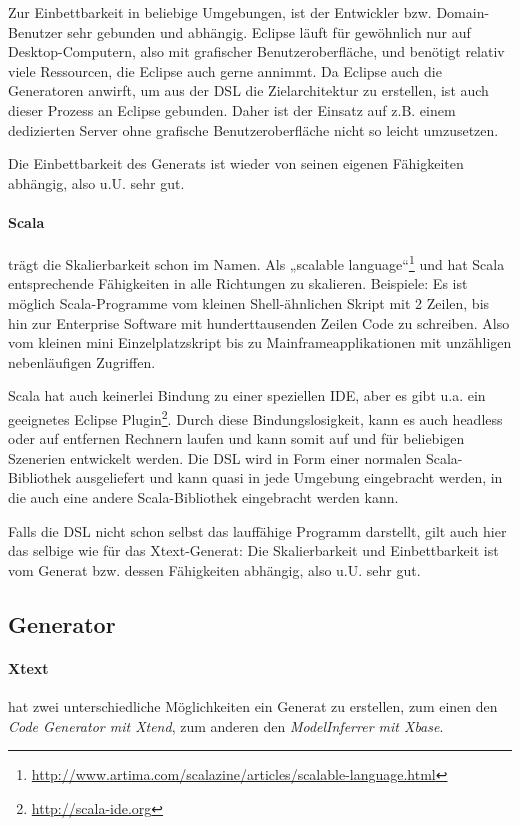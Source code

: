 Zur Einbettbarkeit in beliebige Umgebungen, ist der Entwickler bzw.
Domain-Benutzer sehr gebunden und abhängig. Eclipse läuft für gewöhnlich
nur auf Desktop-Computern, also mit grafischer Benutzeroberfläche,
und benötigt relativ viele Ressourcen, die Eclipse auch
gerne annimmt.
Da Eclipse auch die Generatoren anwirft, um aus der DSL
die Zielarchitektur zu erstellen, ist auch dieser Prozess an Eclipse gebunden.
Daher ist der Einsatz auf z.B. einem dedizierten Server ohne grafische
Benutzeroberfläche nicht so leicht umzusetzen.

Die Einbettbarkeit des Generats ist wieder von seinen eigenen Fähigkeiten
abhängig, also u.U. sehr gut.

\paragraph{Scala} trägt die Skalierbarkeit schon im Namen. 
Als „scalable language“\footnote{
\url{http://www.artima.com/scalazine/articles/scalable-language.html}}
und hat Scala entsprechende Fähigkeiten in alle Richtungen
zu skalieren. Beispiele: Es ist möglich Scala-Programme vom kleinen
Shell-ähnlichen Skript mit 2 Zeilen, bis hin zur Enterprise Software
mit hunderttausenden Zeilen Code zu schreiben. Also vom kleinen mini
Einzelplatzskript bis zu Mainframeapplikationen mit unzähligen nebenläufigen
Zugriffen.

Scala hat auch keinerlei Bindung zu einer speziellen IDE, aber es gibt
u.a. ein geeignetes Eclipse Plugin\footnote{ \url{http://scala-ide.org}}.
Durch diese Bindungslosigkeit, kann
es auch headless oder auf entfernen Rechnern laufen und kann somit auf und für
beliebigen Szenerien entwickelt werden.
Die DSL wird in Form einer normalen Scala-Bibliothek ausgeliefert und
kann quasi in jede Umgebung eingebracht werden, in die auch eine andere
Scala-Bibliothek eingebracht werden kann.

Falls die DSL nicht schon selbst das lauffähige Programm darstellt, gilt
auch hier das selbige wie für das Xtext-Generat: Die Skalierbarkeit und
Einbettbarkeit ist vom Generat bzw. dessen Fähigkeiten abhängig, also u.U.
sehr gut.


\subsection{Generator}\label{sec-generator}

\paragraph{Xtext} hat zwei unterschiedliche Möglichkeiten ein
Generat zu erstellen, zum einen den \emph{Code Generator mit Xtend},
zum anderen den \emph{ModelInferrer mit Xbase}.

